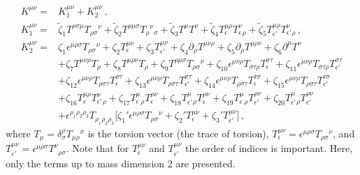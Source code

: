 \documentclass[11pt]{article}
\newcommand{\nn}{\nonumber}
\numberwithin{equation}{section}
\begin{document}
\begin{align}
  K^{\mu\nu}=&
K^{\mu\nu}_1+K_2^{\mu\nu} \,,\\
K^{\mu\nu}_1=&
\tilde\zeta_1 T^{\rho\sigma\mu} T_{\rho\sigma}{}^\nu
+\tilde\zeta_{2} T^{\rho\mu\sigma} T_{\rho}{}^\nu{}_\sigma
+\tilde\zeta_{3} T^\mu T^\nu
+\tilde\zeta_{4} T_\epsilon^{\mu\rho} T_\epsilon^{\nu}{}_\rho
+\tilde\zeta_{5} T_{\epsilon'}^{\mu\rho} T_{\epsilon'}^{\nu}{}_\rho
\,,\\
K^{\mu\nu}_2=&
\zeta_1 \epsilon^{\mu\rho\sigma} T_{\rho\sigma}{}^\nu
+\zeta_2 T_{\epsilon}^{\mu\nu}
+\zeta_3 T_{\epsilon'}^{\mu\nu}
+\zeta_4 \partial_\rho T^{\mu\nu\rho}
+\zeta_5 \partial_\rho T^{\mu\rho\nu}
+\zeta_6 \partial^\mu T^\nu \nn\\&
+\zeta_7 T^{\mu\nu\rho} T_\rho
+\zeta_8 T^{\mu\rho\nu} T_\rho
+\zeta_{9} T^{\rho\mu\sigma} T_{\rho\sigma}{}^\nu
+\zeta_{10} \epsilon^{\mu\nu\rho} T_{\sigma\tau\rho} T_\epsilon^{\sigma\tau}
+\zeta_{11} \epsilon^{\mu\nu\rho} T_{\sigma\tau\rho} T_{\epsilon'}^{\sigma\tau}
\nn\\&
+\zeta_{12} \epsilon^{\mu\nu\rho} T_{\rho \sigma\tau} T_\epsilon^{\sigma\tau}
+\zeta_{13} \epsilon^{\mu\nu\rho} T_{\rho \sigma\tau} T_{\epsilon'}^{\sigma\tau}
+\zeta_{14} \epsilon^{\mu\nu\rho} T_{\rho \sigma\tau} T_\epsilon^{\tau\sigma}
+\zeta_{15} \epsilon^{\mu\nu\rho} T_{\rho \sigma\tau} T_{\epsilon'}^{\tau\sigma}
\nn\\&
+\zeta_{16} T_\epsilon^{\mu\rho} T_{\epsilon'}^{\nu}{}_\rho
+\zeta_{17} T_{\epsilon}^{\mu}{}_\rho T_{\epsilon}^{\rho\nu}
+\zeta_{18} T_{\epsilon'}^{\mu}{}_\rho T_{\epsilon}^{\rho\nu}
+\zeta_{19} T_{\epsilon}^{\mu}{}_\rho T_{\epsilon'}^{\rho\nu}
+\zeta_{20} T_{\epsilon'}^{\mu}{}_\rho T_{\epsilon'}^{\rho\nu}
\nn\\&
+\epsilon^{\rho_1 \rho_2 \rho_3} T_{\rho_1 \rho_2 \rho_3}
\big[
\zeta_1' \epsilon^{\mu\rho\sigma} T_{\rho\sigma}{}^\nu
+\zeta_2' T_{\epsilon}^{\mu\nu}
+\zeta_3' T_{\epsilon'}^{\mu\nu} \big] \,,
\end{align}
where $T_\mu=\delta^\rho_\sigma T_{\mu\rho}{}^\sigma$ is the torsion vector (the trace of torsion),
$T_\epsilon^{\mu\nu}=\epsilon^{\mu\rho\sigma}T_{\rho\sigma}{}^\nu$, and
$T_{\epsilon'}^{\mu\nu}=\epsilon^{\mu\rho\sigma}T^\nu{}_{\rho\sigma}$.
Note that for $T_\epsilon^{\mu\nu}$ and $T_{\epsilon'}^{\mu\nu}$ the order of indices is important.
Here, only the terms up to mass dimension 2 are presented.
\end{document}
